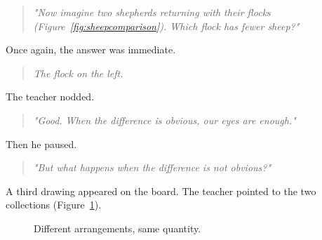 \documentclass[11pt]{article}
\begin{document}
\begin{quote}
\emph{"Now imagine two shepherds returning with their flocks (Figure~\ref{fig:sheepcomparison}). Which flock has fewer sheep?"}
\end{quote}
Once again, the answer was immediate.
\begin{quote}
\emph{The flock on the left.}
\end{quote}
The teacher nodded.
\begin{quote}
\emph{"Good. When the difference is obvious, our eyes are enough."}
\end{quote}
Then he paused.
\begin{quote}
\emph{"But what happens when the difference is not obvious?"}
\end{quote}
A third drawing appeared on the board. The teacher pointed to the two collections (Figure~\ref{fig:samequantity}).


\begin{figure}[ht]
\centering


\caption{
Different arrangements, same quantity.
}

\label{fig:samequantity}

\end{figure}
\end{document}
